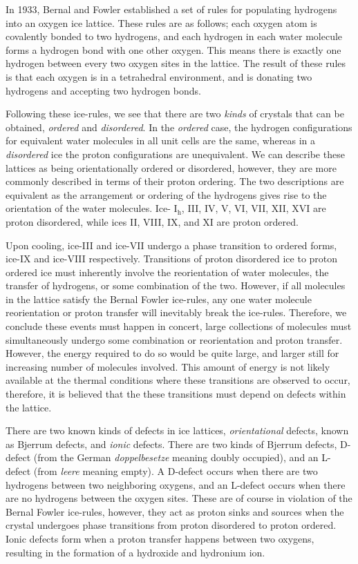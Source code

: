 In 1933, Bernal and Fowler established a set of rules for populating
hydrogens into an oxygen ice lattice. These rules are as follows;
each oxygen atom is covalently bonded to two hydrogens, and each
hydrogen in each water molecule forms a hydrogen bond with one other
oxygen. This means there is exactly one hydrogen between every two
oxygen sites in the lattice. The result of these rules is that each
oxygen is in a tetrahedral environment, and is donating two hydrogens
and accepting two hydrogen bonds.

Following these ice-rules, we see that there are two \textit{kinds} of
crystals that can be obtained, \textit{ordered} and
\textit{disordered}. In the \textit{ordered} case, the hydrogen
configurations for equivalent water molecules in all unit cells are
the same, whereas in a \textit{disordered} ice the proton
configurations are unequivalent. We can describe these lattices as
being orientationally ordered or disordered, however, they are more
commonly described in terms of their proton ordering. The two
descriptions are equivalent as the arrangement or ordering of the
hydrogens gives rise to the orientation of the water molecules.  Ice-
I$_\mathrm{h}$, III, IV, V, VI, VII, XII, XVI are proton disordered,
while ices II, VIII, IX, and XI are proton ordered.

Upon cooling, ice-III and ice-VII undergo a phase transition to
ordered forms, ice-IX and ice-VIII respectively. Transitions of proton
disordered ice to proton ordered ice must inherently involve the
reorientation of water molecules, the transfer of hydrogens, or some
combination of the two. However, if all molecules in the lattice
satisfy the Bernal Fowler ice-rules, any one water molecule
reorientation or proton transfer will inevitably break the
ice-rules. Therefore, we conclude these events must happen in concert,
large collections of molecules must simultaneously undergo some
combination or reorientation and proton transfer. However, the energy
required to do so would be quite large, and larger still for
increasing number of molecules involved. This amount of energy is not
likely available at the thermal conditions where these transitions are
observed to occur, therefore, it is believed that the these
transitions must depend on defects within the lattice. 

There are two known kinds of defects in ice
lattices, \textit{orientational} defects, known as Bjerrum defects,
and \textit{ionic} defects. There are two kinds of Bjerrum defects,
D-defect (from the German \textit{doppelbesetze} meaning doubly
occupied), and an L-defect (from \textit{leere} meaning empty). A
D-defect occurs when there are two hydrogens between two neighboring
oxygens, and an L-defect occurs when there are no hydrogens between
the oxygen sites. These are of course in violation of the Bernal
Fowler ice-rules, however, they act as proton sinks and sources when
the crystal undergoes phase transitions from proton disordered to
proton ordered. Ionic defects form when a proton transfer happens
between two oxygens, resulting in the formation of a hydroxide and
hydronium ion.

